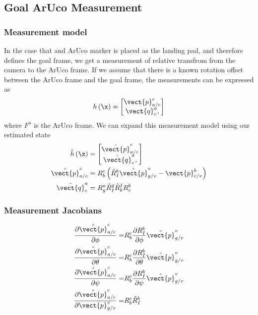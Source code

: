\subsection{Goal ArUco Measurement}
\subsubsection{Measurement model}
In the case that and ArUco marker is placed as the landing pad, and therefore
defines the goal frame, we get a measurement of relative transfrom from the
camera to the ArUco frame. If we assume that there is a known rotation offset
between the ArUco frame and the goal frame, the measurements can be expressed as
\begin{equation}
  h \left( \x \right) = 
  \begin{bmatrix}
    \vect{p}_{a/c}^c \\
    \vect{q}_c^a,
  \end{bmatrix}
\end{equation}
where $F^a$ is the ArUco frame.
We can expand this measurement model using our estimated state
\begin{align}
  \hat{h} \left( \x \right) &=
  \begin{bmatrix}
    \hat{\vect{p}}_{a/c}^c \\
    \hat{\vect{q}}_c^a,
  \end{bmatrix} \\
  \hat{\vect{p}}_{a/c}^c  &= R_b^c \left( \hat{R}_I^b \hat{\vect{p}}_{g/v}^v -
    \vect{p}_{c/v}^b \right) \\
  \hat{\vect{q}}_{c}^a  &= R_g^a \hat{R}_I^g \hat{R}_b^I R_c^b
\end{align}

\subsubsection{Measurement Jacobians}
\begin{align}
  \frac{\partial \hat{\vect{p}}_{a/c}^c}{\partial \phi} =& R_b^c \frac{\partial
  R_I^b}{\partial \phi} \hat{\vect{p}}_{g/v}^v \\
  \frac{\partial \hat{\vect{p}}_{a/c}^c}{\partial \theta} =& R_b^c \frac{\partial
  R_I^b}{\partial \theta} \hat{\vect{p}}_{g/v}^v \\
  \frac{\partial \hat{\vect{p}}_{a/c}^c}{\partial \psi} =& R_b^c \frac{\partial
  R_I^b}{\partial \psi} \hat{\vect{p}}_{g/v}^v \\
    \frac{\partial \hat{\vect{p}}_{a/c}^c}{\partial \vect{p}_{g/v}^v} =& R_b^c \hat{R}_I^b
\end{align}

